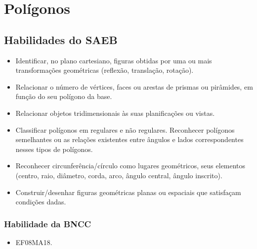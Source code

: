 






\chapter{Polígonos}

\section{Habilidades do SAEB}

\begin{itemize}
\item Identificar, no plano cartesiano, figuras obtidas
por uma ou mais transformações geométricas (reflexão, translação,
rotação).
\item
  Relacionar o número de vértices, faces ou arestas de prismas ou
  pirâmides, em função do seu polígono da base.
\item
  Relacionar objetos tridimensionais às suas planificações ou vistas.
\item
  Classificar polígonos em regulares e não regulares. Reconhecer
  polígonos semelhantes ou as relações existentes entre ângulos e lados
  correspondentes nesses tipos de polígonos.
\item
  Reconhecer circunferência/círculo como lugares geométricos, seus
  elementos (centro, raio, diâmetro, corda, arco, ângulo central, ângulo
  inscrito).
\item
  Construir/desenhar figuras geométricas planas ou espaciais que
  satisfaçam condições dadas.
\end{itemize}

\subsection{Habilidade da BNCC}

\begin{itemize}
\item EF08MA18.
\end{itemize}


